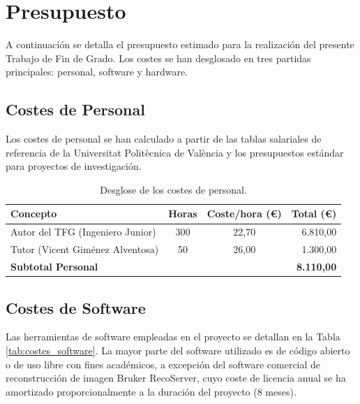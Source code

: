 \chapter{Presupuesto}
\label{cap:presupuesto}

A continuación se detalla el presupuesto estimado para la realización del presente Trabajo de Fin de Grado. Los costes se han desglosado en tres partidas principales: personal, software y hardware.

\section{Costes de Personal}

Los costes de personal se han calculado a partir de las tablas salariales de referencia de la Universitat Politècnica de València y los presupuestos estándar para proyectos de investigación.

\begin{table}[htbp]
  \centering
  \renewcommand{\arraystretch}{1.3}
  \begin{tabular}{l c c r}
    \hline
    \textbf{Concepto}                & \textbf{Horas} & \textbf{Coste/hora (\euro)} & \textbf{Total (\euro)} \\
    \hline
    Autor del TFG (Ingeniero Junior) & 300            & 22,70                       & 6.810,00               \\
    Tutor (Vicent Giménez Alventosa) & 50             & 26,00                       & 1.300,00                 \\
    \hline
    \textbf{Subtotal Personal}       &                &                             & \textbf{8.110,00}     \\
    \hline
  \end{tabular}
  \caption{Desglose de los costes de personal.}
  \label{tab:costes_personal}
\end{table}

\section{Costes de Software}

Las herramientas de software empleadas en el proyecto se detallan en la Tabla \ref{tab:costes_software}. La mayor parte del software utilizado es de código abierto o de uso libre con fines académicos, a excepción del software comercial de reconstrucción de imagen Bruker RecoServer, cuyo coste de licencia anual se ha amortizado proporcionalmente a la duración del proyecto (8 meses).

